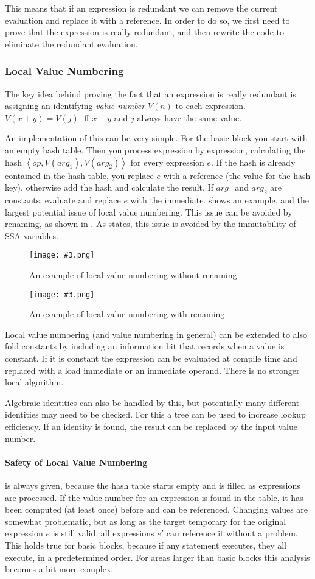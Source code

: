 \documentclass{article}
\newcommand{\fig}[4]{
	\begin{figure}[#1]
		\center
		\texttt{[image: \#3.png]}
		\caption{#4}
		\label{fig:#3}
	\end{figure}
	}
\begin{document}
This means that if an expression is redundant we can remove the current evaluation and replace it with a reference.
In order to do so, we first need to prove that the expression is really redundant, and then rewrite the code to eliminate the redundant evaluation.

\subsubsection{Local Value Numbering}
The key idea behind proving the fact that an expression is really redundant is assigning an identifying \emph{value number} $V(n)$ to each expression.
$V(x+y) = V(j)$ iff $x+y$ and $j$ always have the same value.

An implementation of this can be very simple.
For the basic block you start with an empty hash table.
Then you process expression by expression, calculating the hash $\left<op,V(arg_1),V(arg_2)\right>$ for every expression $e$.
If the hash is already contained in the hash table, you replace $e$ with a reference (the value for the hash key), otherwise add the hash and calculate the result.
If $arg_1$ and $arg_2$ are constants, evaluate and replace $e$ with the immediate.
 shows an example, and the largest potential issue of local value numbering.
This issue can be avoided by renaming, as shown in .
As  states, this issue is avoided by the immutability of SSA variables.

\fig{h}{}{lvn}{An example of local value numbering without renaming}
\fig{h}{}{lvn2}{An example of local value numbering with renaming}

Local value numbering (and value numbering in general) can be extended to also fold constants by including an information bit that records when a value is constant.
If it is constant the expression can be evaluated at compile time and replaced with a load immediate or an immediate operand.
There is no stronger local algorithm.

Algebraic identities can also be handled by this, but potentially many different identities may need to be checked.
For this a tree can be used to increase lookup efficiency.
If an identity is found, the result can be replaced by the input value number.

\paragraph{Safety of Local Value Numbering} is always given, because the hash table starts empty and is filled as expressions are processed.
If the value number for an expression is found in the table, it has been computed (at least once) before and can be referenced.
Changing values are somewhat problematic, but as long as the target temporary for the original expression $e$ is still valid, all expressions $e'$ can reference it without a problem.
This holds true for basic blocks, because if any statement executes, they all execute, in a predetermined order.
For areas larger than basic blocks this analysis becomes a bit more complex.
\end{document}
